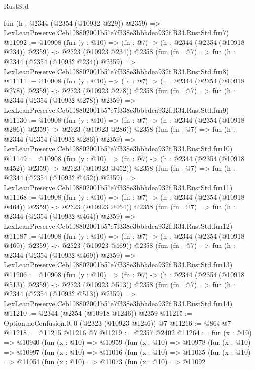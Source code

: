 \begin{lexlean}{RustStd}
\begin{coremodule}
    fun (h : @2344 (@2354 (@10932 @229)) @2359) =>
    LexLeanPreserve.Ceb108802001b57e7f338e3bbbdea932f.R34.RustStd.fun7)
@11092 := @10908
    (fun (y : @10) => (fn : @7) -> (h : @2344 (@2354 (@10918 @234)) @2359) -> @2323 (@10923 @234))
    @2358
    (fun (fn : @7) =>
    fun (h : @2344 (@2354 (@10932 @234)) @2359) =>
    LexLeanPreserve.Ceb108802001b57e7f338e3bbbdea932f.R34.RustStd.fun8)
@11111 := @10908
    (fun (y : @10) => (fn : @7) -> (h : @2344 (@2354 (@10918 @278)) @2359) -> @2323 (@10923 @278))
    @2358
    (fun (fn : @7) =>
    fun (h : @2344 (@2354 (@10932 @278)) @2359) =>
    LexLeanPreserve.Ceb108802001b57e7f338e3bbbdea932f.R34.RustStd.fun9)
@11130 := @10908
    (fun (y : @10) => (fn : @7) -> (h : @2344 (@2354 (@10918 @286)) @2359) -> @2323 (@10923 @286))
    @2358
    (fun (fn : @7) =>
    fun (h : @2344 (@2354 (@10932 @286)) @2359) =>
    LexLeanPreserve.Ceb108802001b57e7f338e3bbbdea932f.R34.RustStd.fun10)
@11149 := @10908
    (fun (y : @10) => (fn : @7) -> (h : @2344 (@2354 (@10918 @452)) @2359) -> @2323 (@10923 @452))
    @2358
    (fun (fn : @7) =>
    fun (h : @2344 (@2354 (@10932 @452)) @2359) =>
    LexLeanPreserve.Ceb108802001b57e7f338e3bbbdea932f.R34.RustStd.fun11)
@11168 := @10908
    (fun (y : @10) => (fn : @7) -> (h : @2344 (@2354 (@10918 @464)) @2359) -> @2323 (@10923 @464))
    @2358
    (fun (fn : @7) =>
    fun (h : @2344 (@2354 (@10932 @464)) @2359) =>
    LexLeanPreserve.Ceb108802001b57e7f338e3bbbdea932f.R34.RustStd.fun12)
@11187 := @10908
    (fun (y : @10) => (fn : @7) -> (h : @2344 (@2354 (@10918 @469)) @2359) -> @2323 (@10923 @469))
    @2358
    (fun (fn : @7) =>
    fun (h : @2344 (@2354 (@10932 @469)) @2359) =>
    LexLeanPreserve.Ceb108802001b57e7f338e3bbbdea932f.R34.RustStd.fun13)
@11206 := @10908
    (fun (y : @10) => (fn : @7) -> (h : @2344 (@2354 (@10918 @513)) @2359) -> @2323 (@10923 @513))
    @2358
    (fun (fn : @7) =>
    fun (h : @2344 (@2354 (@10932 @513)) @2359) =>
    LexLeanPreserve.Ceb108802001b57e7f338e3bbbdea932f.R34.RustStd.fun14)
@11210 := @2344 (@2354 (@10918 @1246)) @2359
@11215 := Option.noConfusion.{0, 0} (@2323 (@10923 @1246)) @7
@11216 := @864 @7
@11218 := @11215 @11216 @7
@11219 := @2357 @2402
@11264 := fun (x : @10) =>
  @10940
    (fun (x : @10) =>
    @10959
      (fun (x : @10) =>
      @10978
        (fun (x : @10) =>
        @10997
          (fun (x : @10) =>
          @11016
            (fun (x : @10) =>
            @11035
              (fun (x : @10) =>
              @11054
                (fun (x : @10) =>
                @11073
                  (fun (x : @10) =>
                  @11092

\end{coremodule}
\end{lexlean}
